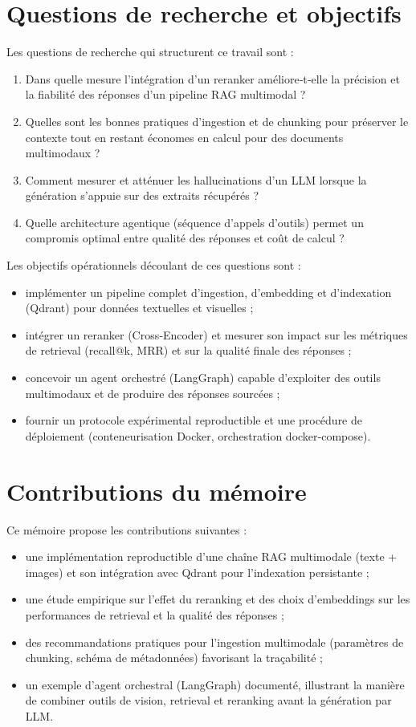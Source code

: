 \documentclass[12pt,a4paper]{report}
\begin{document}
\section{Questions de recherche et objectifs}
Les questions de recherche qui structurent ce travail sont :
\begin{enumerate}
  \item Dans quelle mesure l'intégration d'un reranker améliore‑t‑elle la précision et la fiabilité des réponses d'un pipeline RAG multimodal ?
  \item Quelles sont les bonnes pratiques d'ingestion et de chunking pour préserver le contexte tout en restant économes en calcul pour des documents multimodaux ?
  \item Comment mesurer et atténuer les hallucinations d'un LLM lorsque la génération s'appuie sur des extraits récupérés ?
  \item Quelle architecture agentique (séquence d'appels d'outils) permet un compromis optimal entre qualité des réponses et coût de calcul ?
\end{enumerate}

Les objectifs opérationnels découlant de ces questions sont :
\begin{itemize}
  \item implémenter un pipeline complet d'ingestion, d'embedding et d'indexation (Qdrant) pour données textuelles et visuelles ;
  \item intégrer un reranker (Cross‑Encoder) et mesurer son impact sur les métriques de retrieval (recall@k, MRR) et sur la qualité finale des réponses ;
  \item concevoir un agent orchestré (LangGraph) capable d'exploiter des outils multimodaux et de produire des réponses sourcées ;
  \item fournir un protocole expérimental reproductible et une procédure de déploiement (conteneurisation Docker, orchestration docker‑compose).
\end{itemize}

\section{Contributions du mémoire}
Ce mémoire propose les contributions suivantes :
\begin{itemize}
  \item une implémentation reproductible d'une chaîne RAG multimodale (texte + images) et son intégration avec Qdrant pour l'indexation persistante ;
  \item une étude empirique sur l'effet du reranking et des choix d'embeddings sur les performances de retrieval et la qualité des réponses ;
  \item des recommandations pratiques pour l'ingestion multimodale (paramètres de chunking, schéma de métadonnées) favorisant la traçabilité ;
  \item un exemple d'agent orchestral (LangGraph) documenté, illustrant la manière de combiner outils de vision, retrieval et reranking avant la génération par LLM.
\end{itemize}
\end{document}
